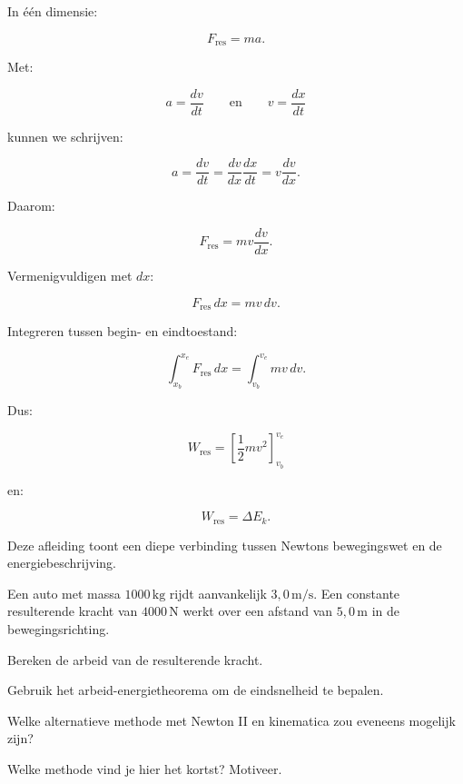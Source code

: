 \documentclass{ximera}
\begin{document}
In één dimensie:

\[
F_{\mathrm{res}}=ma.
\]

Met:

\[
a=\frac{dv}{dt}
\qquad\text{en}\qquad
v=\frac{dx}{dt}
\]

kunnen we schrijven:

\[
a
=
\frac{dv}{dt}
=
\frac{dv}{dx}\frac{dx}{dt}
=
v\frac{dv}{dx}.
\]

Daarom:

\[
F_{\mathrm{res}}
=
mv\frac{dv}{dx}.
\]

Vermenigvuldigen met $dx$:

\[
F_{\mathrm{res}}\,dx=m v\,dv.
\]

Integreren tussen begin- en eindtoestand:

\[
\int_{x_b}^{x_e}F_{\mathrm{res}}\,dx
=
\int_{v_b}^{v_e}mv\,dv.
\]

Dus:

\[
W_{\mathrm{res}}
=
\left[\frac12mv^2\right]_{v_b}^{v_e}
\]

en:

\[
\boxed{
W_{\mathrm{res}}=\Delta E_k.
}
\]

Deze afleiding toont een diepe verbinding tussen Newtons bewegingswet en de
energiebeschrijving.


\begin{oefening}{\oefB\ESS}

Een auto met massa $1000\,\mathrm{kg}$ rijdt aanvankelijk
$3{,}0\,\mathrm{m/s}$. Een constante resulterende kracht van
$4000\,\mathrm N$ werkt over een afstand van $5{,}0\,\mathrm m$ in de
bewegingsrichting.

\begin{question}
Bereken de arbeid van de resulterende kracht.
\end{question}

\begin{question}
Gebruik het arbeid-energietheorema om de eindsnelheid te bepalen.
\end{question}

\begin{question}
Welke alternatieve methode met Newton II en kinematica zou eveneens mogelijk
zijn?
\end{question}

\begin{question}
Welke methode vind je hier het kortst? Motiveer.
\end{question}

\end{oefening}
\end{document}
